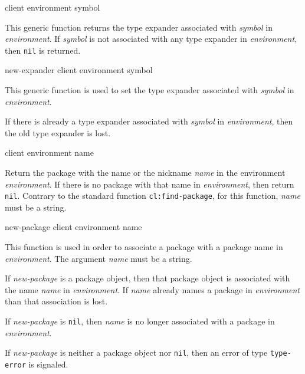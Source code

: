  {client environment symbol}

This generic function returns the type expander associated with
\textit{symbol} in \textit{environment}.  If \textit{symbol} is not
associated with any type expander in \textit{environment}, then
\texttt{nil} is returned.

 {new-expander client environment symbol}

This generic function is used to set the type expander associated with
\textit{symbol} in \textit{environment}.

If there is already a type expander associated with \textit{symbol} in
\textit{environment}, then the old type expander is lost.

 {client environment name}

Return the package with the name or the nickname \textit{name} in the
environment \textit{environment}.  If there is no package with that
name in \textit{environment}, then return \texttt{nil}.  Contrary to
the standard \commonlisp{} function \texttt{cl:find-package}, for this
function, \textit{name} must be a string.

 {new-package client environment name}

This function is used in order to associate a package with a package
name in \textit{environment}.  The argument \textit{name} must be a
string.

If \textit{new-package} is a package object, then that package object
is associated with the name \textit{name} in
\textit{environment}.  If \textit{name} already names a package in
\textit{environment} than that association is lost.

If \textit{new-package} is \texttt{nil}, then \textit{name} is no
longer associated with a package in \textit{environment}.

If \textit{new-package} is neither a package object nor \texttt{nil},
then an error of type \texttt{type-error} is signaled.
